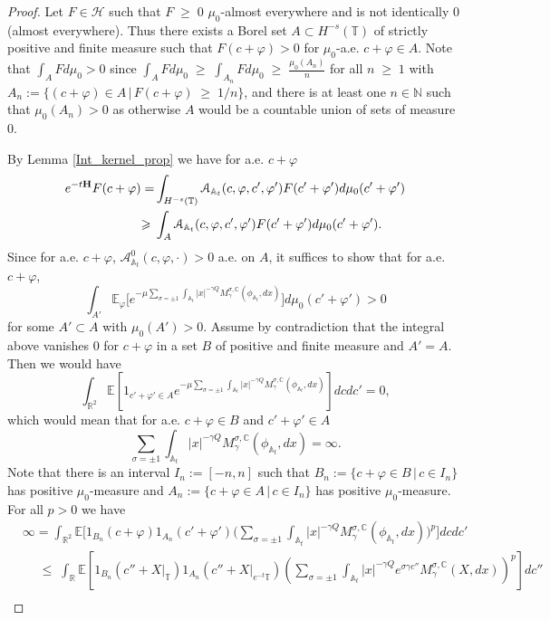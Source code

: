 \documentclass[11pt]{amsart}
\numberwithin{equation}{section}
\theoremstyle{definition}
\renewcommand{\leq}{\;\leqslant\;}                   %
\renewcommand{\geq}{\;\geqslant\;}                   %
\newcommand{\C}{\mathbb{C}}
\newcommand{\A}{\mathbb{A}}
\newcommand{\R}{\mathbb{R}}
\newcommand{\N}{\mathbb{N}}
\def\E{\mathbb{E}}
\newcommand{\mc}{\mathcal}
\def\T{\mathbb{T}}
\begin{document}
\begin{proof}
Let $F\in \mc{H}$ such that $F\geq 0$ $\mu_0$-almost everywhere and is not identically 0 (almost everywhere). 
Thus there exists a Borel set $A \subset H^{-s}(\T)$ of strictly positive and finite measure such that $F(c+\varphi) > 0$ for $\mu_0$-a.e. $c+\varphi \in A$. 
Note that $\int_{A} F d\mu_0  > 0$ since $\int_{A} Fd\mu_0  \geq \int_{A_n}Fd\mu_0\geq \frac{\mu_0(A_n)}{n}$
 for all $n\geq 1$ with $A_n:=\{(c+\varphi)\in A\,|\, F(c+\varphi)\geq 1/n\}$,
and there is at least one $n\in \N$ such that $\mu_0(A_n)>0$ as otherwise $A$ would be a countable union of sets of measure $0$.

By Lemma \ref{Int_kernel_prop} we have for a.e. $c+\varphi$
\[\begin{split}
e^{-t{\bf H}}F(c+\varphi)=& \int_{H^{-s}(\T)}\mc{A}_{\A_t}(c,\varphi,c',\varphi')F(c'+\varphi')d\mu_{0}(c'+\varphi')\\
\geq &  \int_{A}\mc{A}_{\A_t}(c,\varphi,c',\varphi')F(c'+\varphi')d\mu_{0}(c'+\varphi').
\end{split}\]
Since for a.e. $c+\varphi$, $\mc{A}^0_{\A_t}(c,\varphi,\cdot )>0$ a.e. on $A$, 
it suffices to show that for a.e. $c+\varphi$,
\[ \int_{A'}\E_{\varphi}\Big[e^{-\mu \sum_{\sigma=\pm 1}\int_{\A_t}|x|^{-\gamma Q}M_{\gamma}^{\sigma,\C}(\phi_{\A_t},dx)}\Big] d\mu_0(c'+\varphi')>0
\]  
for some $A'\subset A$ with $\mu_0(A')>0$. Assume by contradiction that the integral above vanishes $0$ for $c+\varphi$ in a set $B$ of positive and finite measure and $A'=A$. Then we would have 
\[  \int_{\R^2}\E[1_{c'+\varphi'\in A}e^{-\mu \sum_{\sigma=\pm 1}\int_{\A_t}|x|^{-\gamma Q}M_{\gamma}^{\sigma,\C}(\phi_{\A_t},dx)}]dcdc'=0,\]
which would mean that for a.e. $c+\varphi\in B$ and  $c'+\varphi'\in A$
\[\sum_{\sigma=\pm 1}\int_{\A_t}|x|^{-\gamma Q}M_{\gamma}^{\sigma,\C}(\phi_{\A_t},dx)=\infty.\]
Note that there is an interval $I_n:=[-n,n]$ such that $B_n:=\{c+\varphi\in B\,|\, c\in I_n\}$ has positive $\mu_0$-measure
and  $A_n:=\{c+\varphi\in A\,|\, c\in I_n\}$ has positive $\mu_0$-measure.
For all $p>0$ we have 
\begin{align*}
& \infty=\int_{\R^2}\E\Big[1_{B_n}(c+\varphi)1_{A_n}(c'+\varphi')\Big(\sum_{\sigma=\pm 1}\int_{\A_t}|x|^{-\gamma Q}M_{\gamma}^{\sigma,\C}(\phi_{\A_t},dx)\Big)^p\Big]dc dc'\\
& \quad \leq \int_{\R}
\mathbb{E}\left[ 1_{B_n}(c''+X|_{\T}) 1_{A_n}(c''+X|_{e^{-t}\T})\left(\sum_{\sigma = \pm 1} \int_{\mathbb{A}_t}|x|^{-\gamma Q} e^{\sigma \gamma c''} M_\gamma^{\sigma,\mathbb{C}}(X,dx) \right)^p\right]dc'' \\

\end{align*}
\end{proof}
\end{document}
